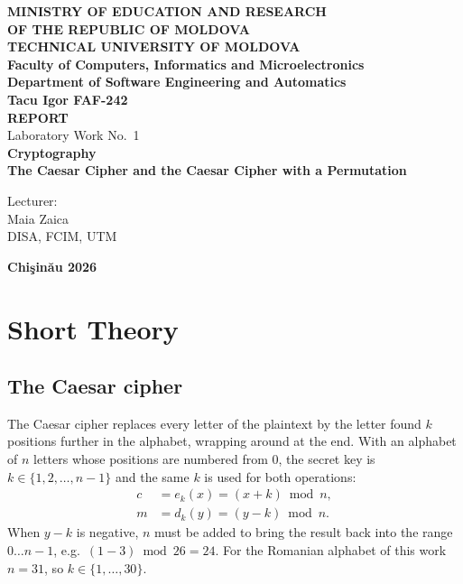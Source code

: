 \documentclass[12pt,a4paper]{article}
\begin{document}
\begin{titlepage}
\begin{center}
  \textbf{MINISTRY OF EDUCATION AND RESEARCH}\\
  \textbf{OF THE REPUBLIC OF MOLDOVA}\\[0.5em]
  \textbf{TECHNICAL UNIVERSITY OF MOLDOVA}\\
  \textbf{Faculty of Computers, Informatics and Microelectronics}\\
  \textbf{Department of Software Engineering and Automatics}\\[2em]

  \vspace{1.5cm}
  \textbf{\Large Tacu Igor \textemdash{} FAF-242}\\[3em]

  \textbf{\Large REPORT}\\[0.5em]
  Laboratory Work No.\ 1\\[0.5em]
  \textbf{Cryptography}\\[0.5em]
  \textbf{The Caesar Cipher and the Caesar Cipher with a Permutation}\\[3em]

  \vfill
  \begin{flushright}
    Lecturer:\\
    Maia Zaica\\
    DISA, FCIM, UTM
  \end{flushright}
  \vfill

  \large \textbf{Chi\c{s}in\u{a}u \textemdash{} 2026}
\end{center}
\end{titlepage}

\tableofcontents
\newpage

\section{Short Theory}

\subsection{The Caesar cipher}

The Caesar cipher replaces every letter of the plaintext by the letter found $k$
positions further in the alphabet, wrapping around at the end. With an alphabet of
$n$ letters whose positions are numbered from $0$, the secret key is
$k \in \{1,2,\dots,n-1\}$ and the same $k$ is used for both operations:
\begin{align*}
  c &= e_k(x) = (x + k) \bmod n, \\
  m &= d_k(y) = (y - k) \bmod n.
\end{align*}
When $y-k$ is negative, $n$ must be added to bring the result back into the range
$0\dots n-1$, e.g.\ $(1-3) \bmod 26 = 24$. For the Romanian alphabet of this work
$n = 31$, so $k \in \{1,\dots,30\}$.
\end{document}
